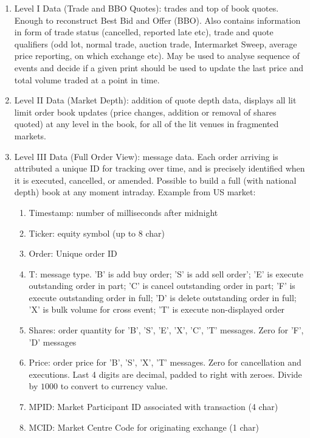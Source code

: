 \documentclass[a4paper,oneside,openany]{book}
\begin{document}
\begin{definition} 
\begin{enumerate}[label=\roman*.]
\setlength{\itemsep}{0pt}
\item Level I Data (Trade and BBO Quotes): trades and top of book quotes. Enough to reconstruct Best Bid and Offer (BBO). Also contains information in form of trade status (cancelled, reported late etc), trade and quote qualifiers (odd lot, normal trade, auction trade, Intermarket Sweep, average price reporting, on which exchange etc). May be used to analyse sequence of events and decide if a given print should be used to update the last price and total volume traded at a point in time.
\item Level II Data (Market Depth): addition of quote depth data, displays all lit limit order book updates (price changes, addition or removal of shares quoted) at any level in the book, for all of the lit venues in fragmented markets.
\item Level III Data (Full Order View): message data. Each order arriving is attributed a unique ID for tracking over time, and is precisely identified when it is executed, cancelled, or amended. Possible to build a full (with national depth) book at any moment intraday. Example from US market:
\begin{enumerate}[label=\arabic*.]
\setlength{\itemsep}{0pt}
\item Timestamp: number of milliseconds after midnight
\item Ticker: equity symbol (up to 8 char)
\item Order: Unique order ID
\item T: message type. 'B' is add buy order; 'S' is add sell order'; 'E' is execute outstanding order in part; 'C' is cancel outstanding order in part; 'F' is execute outstanding order in full; 'D' is delete outstanding order in full; 'X' is bulk volume for cross event; 'T' is execute non-displayed order
\item Shares: order quantity for 'B', 'S', 'E', 'X', 'C', 'T' messages. Zero for 'F', 'D' messages
\item Price: order price for 'B', 'S', 'X', 'T' messages. Zero for cancellation and executions. Last 4 digits are decimal, padded to right with zeroes. Divide by $1000$ to convert to currency value.
\item MPID: Market Participant ID associated with transaction (4 char)
\item MCID: Market Centre Code for originating exchange (1 char)

\end{enumerate}
\end{enumerate}
\end{definition}
\end{document}
